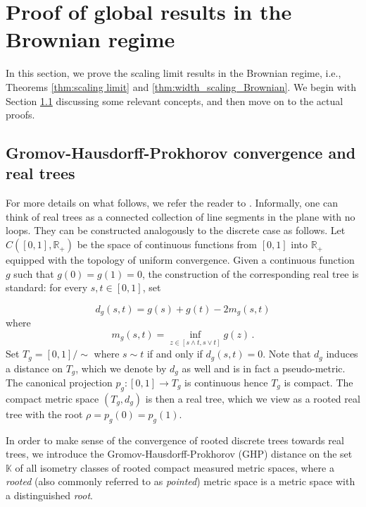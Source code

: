 \documentclass{article}
\newcommand{\1}{\mathbbm{1}}								%
\theoremstyle{definition}
\numberwithin{equation}{section}
\newcommand{\R}{\mathbb R}
\begin{document}
\section{Proof of global results in the Brownian regime}\label{sec:global_result_proofs}
In this section, we prove the scaling limit results in the Brownian regime, i.e., Theorems \ref{thm:scaling limit} and \ref{thm:width_scaling_Brownian}. We begin with Section \ref{sec:def_realtrees_GHP} discussing some relevant concepts, and then move on to the actual proofs.

\subsection{Gromov-Hausdorff-Prokhorov convergence and real trees}\label{sec:def_realtrees_GHP}
For more details on what follows, we refer the reader to \cite[Section 3]{gall2011scaling}. Informally, one can think of real trees as a connected collection of line segments in the plane with no loops. They can be constructed analogously to the discrete case as follows. Let $C([0,1], \R _+ )$ be the space of continuous functions from $[0,1]$ into $\R_+$ equipped with the topology of uniform convergence. Given a continuous function $g$ such that $g(0)=g(1)=0$, the construction of the corresponding real tree is standard: for every $s,t \in [0,1]$, set

$$
d_g(s,t) = g(s)+g(t)-2m_g(s,t)
$$ where $$m_g(s,t)= \inf _{z\in [s\wedge t,s\vee t]} g(z) \, .$$ Set $T_g = [0,1] /\!\!\sim$ where $s \sim t$ if and only if $d_g(s,t)=0$. Note that $d_g$ induces a distance on $T_g$, which we denote by $d_g$ as well and is in fact a pseudo-metric. The canonical projection $p_g : [0,1] \to T_g$ is continuous hence $T_g$ is compact. The compact metric space $(T_g,d_g)$ is then a real tree, which we view as a rooted real tree with the root $\rho=p_g(0)=p_g(1)$. 

In order to make sense of the convergence of rooted discrete trees towards real trees, we introduce the Gromov-Hausdorff-Prokhorov (GHP) distance on the set $\mathbb K$ of all isometry classes of {rooted} compact measured metric spaces, where a \emph{rooted} (also commonly referred to as \emph{pointed}) metric space is a metric space with a distinguished \emph{root}.
\end{document}
